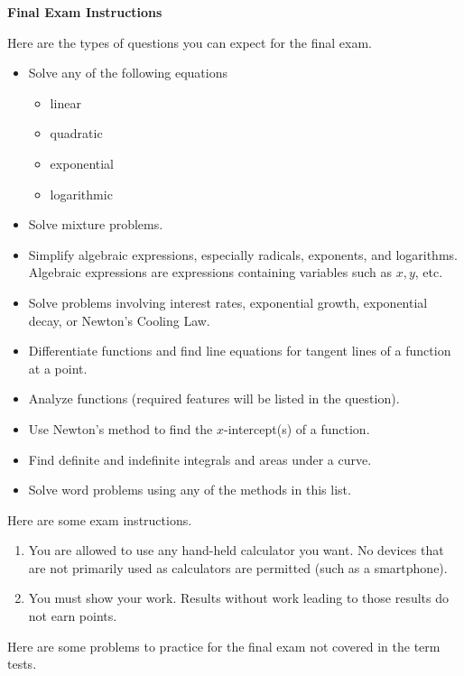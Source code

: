 \documentclass[11pt]{article}
\begin{document}
\textbf{Final Exam Instructions}

Here are the types of questions you can expect for the final exam.

\begin{itemize}
\item Solve any of the following equations
  \begin{itemize}
  \item linear
  \item quadratic
  \item exponential
  \item logarithmic
  \end{itemize}
\item Solve mixture problems.
\item Simplify algebraic expressions, especially radicals, exponents,
  and logarithms. Algebraic expressions are expressions containing
  variables such as $x,y$, etc.
\item Solve problems involving interest rates, exponential growth,
  exponential decay, or Newton's Cooling Law.
\item Differentiate functions and find line equations for tangent
  lines of a function at a point.
\item Analyze functions (required features will be listed in the
  question).
\item Use Newton's method to find the $x$-intercept(s) of a function.
\item Find definite and indefinite integrals and areas under a curve.
\item Solve word problems using any of the methods in this list.
\end{itemize}

Here are some exam instructions.

\begin{enumerate}
\item You are allowed to use any hand-held calculator you want. No
  devices that are not primarily used as calculators are permitted
  (such as a smartphone).
\item You must show your work. Results without work leading to those
  results do not earn points.
\end{enumerate}

Here are some problems to practice for the final exam not covered in
the term tests.

\end{document}
